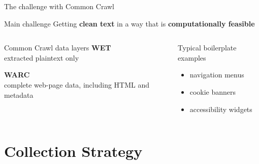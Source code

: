 \documentclass[11pt,notheorems,aspectratio=169]{beamer}
\begin{document}
	\begin{frame}{The challenge with Common Crawl}
		\begin{alertblock}{Main challenge}
			Getting \textbf{clean text} in a way that is \textbf{computationally feasible}
		\end{alertblock}
		
		\vspace{0.6em}
		
		\begin{columns}[T,onlytextwidth]
			\begin{block}{Common Crawl data layers}
				\small
				\textbf{WET}\\
				extracted plaintext only
				
				\vspace{0.6em}
				
				\textbf{WARC}\\
				complete web-page data, including HTML and metadata
			\end{block}
			
			\begin{block}{Typical boilerplate examples}
				\begin{itemize}
					\item navigation menus
					\item cookie banners
					\item accessibility widgets
				\end{itemize}
			\end{block}
		\end{columns}
	\end{frame}
	
	\section{Collection Strategy}
	
\end{document}
